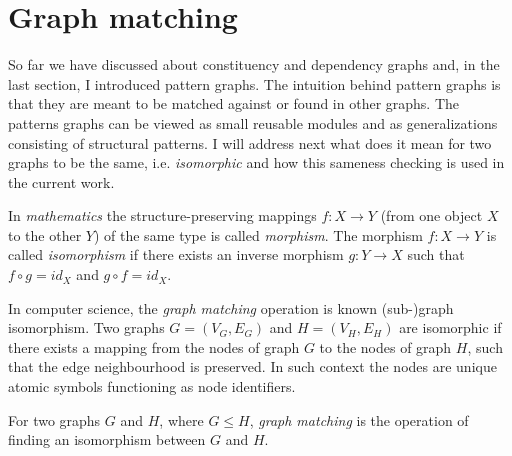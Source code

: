 \section{Graph matching}
\label{sec:graph-matching}

So far we have discussed about constituency and dependency graphs and, in the last section, I introduced pattern graphs. The intuition behind pattern graphs is that they are meant to be matched against or found in other graphs. The patterns graphs can be viewed as small reusable modules and as generalizations consisting of structural patterns. I will address next what does it mean for two graphs to be the same, i.e. \textit{isomorphic} and how this sameness checking is used in the current work. 

In \textit{mathematics} the structure-preserving mappings $f:X \rightarrow Y$ (from one object $X$ to the other $Y$) of the same type is called \textit{morphism}. The morphism $f:X \rightarrow Y$ is called \textit{isomorphism} if there exists an inverse morphism $g:Y \rightarrow X$ such that $f \circ g = id_{X}$ and $ g \circ f = id_{X}$.

%
%

In computer science, the \textit{graph matching} operation is known (sub-)graph isomorphism. Two graphs $G=(V_G,E_G)$ and $H=(V_H,E_H)$ are isomorphic if there exists a mapping from the nodes of graph $G$ to the nodes of graph $H$, such that the edge neighbourhood is preserved. In such context the nodes are unique atomic symbols functioning as node identifiers. 
 

\begin{definition}\label{def:gmatching}
    For two graphs $G$ and $H$, where $G \leq H$, \textit{graph matching} is the operation of finding an isomorphism between $G$ and $H$.
\end{definition}

